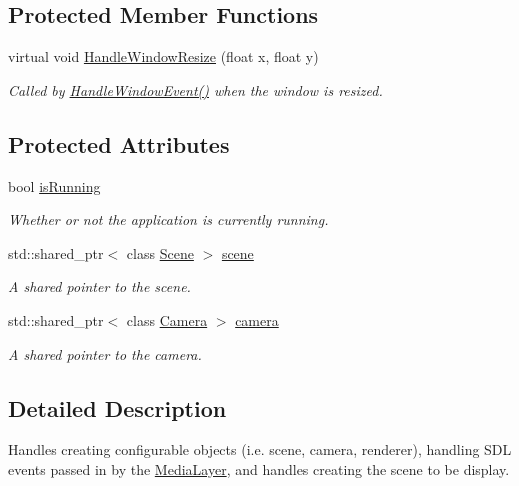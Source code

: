 \subsection*{Protected Member Functions}
\begin{DoxyCompactItemize}
\item 
virtual void \hyperlink{class_application_abdba284a0f075ee1d4a2108c3a5236a2}{Handle\+Window\+Resize} (float x, float y)
\begin{DoxyCompactList}\small\item\em Called by \hyperlink{class_application_a74d92db64e051efa56d0357989dcb755}{Handle\+Window\+Event()} when the window is resized. \end{DoxyCompactList}\end{DoxyCompactItemize}
\subsection*{Protected Attributes}
\begin{DoxyCompactItemize}
\item 
bool \hyperlink{class_application_ae1c1ff7a7663d9baa9b65a7ba8e1dcf8}{is\+Running}
\begin{DoxyCompactList}\small\item\em Whether or not the application is currently running. \end{DoxyCompactList}\item 
std\+::shared\+\_\+ptr$<$ class \hyperlink{class_scene}{Scene} $>$ \hyperlink{class_application_a88c6615107a5094bb93fa5f153f79554}{scene}
\begin{DoxyCompactList}\small\item\em A shared pointer to the scene. \end{DoxyCompactList}\item 
std\+::shared\+\_\+ptr$<$ class \hyperlink{class_camera}{Camera} $>$ \hyperlink{class_application_a0e8589fcb13c520ba472473abe5a518d}{camera}
\begin{DoxyCompactList}\small\item\em A shared pointer to the camera. \end{DoxyCompactList}\end{DoxyCompactItemize}


\subsection{Detailed Description}
Handles creating configurable objects (i.\+e. scene, camera, renderer), handling S\+D\+L events passed in by the \hyperlink{class_media_layer}{Media\+Layer}, and handles creating the scene to be display. 

